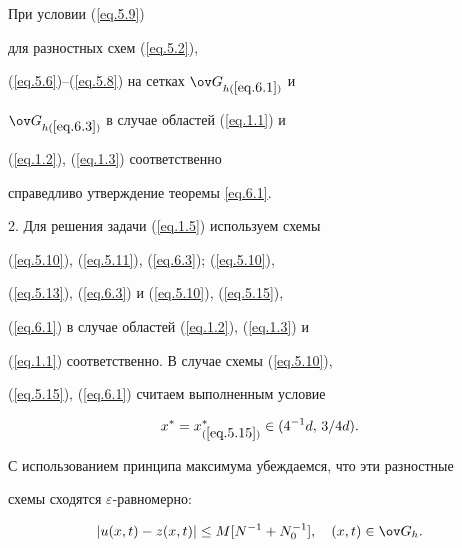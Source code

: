 \begin{notenonum}


При условии (\ref{eq.5.9})


для разностных схем (\ref{eq.5.2}),


(\ref{eq.5.6})--(\ref{eq.5.8}) на сетках $\ov G_{h(\ref{eq.6.1})}$ и


$\ov G_{h(\ref{eq.6.3})}$ в случае областей (\ref{eq.1.1}) и


(\ref{eq.1.2}), (\ref{eq.1.3}) соответственно


справедливо утверждение теоремы \ref{eq.6.1}.


\end{notenonum}





2. Для решения задачи (\ref{eq.1.5}) используем схемы


(\ref{eq.5.10}), (\ref{eq.5.11}), (\ref{eq.6.3}); (\ref{eq.5.10}),


(\ref{eq.5.13}), (\ref{eq.6.3}) и (\ref{eq.5.10}), (\ref{eq.5.15}),


(\ref{eq.6.1}) в случае областей (\ref{eq.1.2}), (\ref{eq.1.3}) и


(\ref{eq.1.1}) соответственно. В случае схемы (\ref{eq.5.10}),


(\ref{eq.5.15}), (\ref{eq.6.1}) считаем выполненным условие


\begin{equation}


\label{eq.6.4}


x^*=x^*_{(\ref{eq.5.15})}\in (4^{-1} d, \, 3/4 d).


\end{equation}


С использованием принципа максимума убеждаемся, что эти разностные


схемы сходятся $\varepsilon$-равномерно:


\begin{equation}


\label{eq.6.5}


|u(x, t)-z(x, t)|\le M [N^{-1}+N_0^{-1}], \quad (x, t)\in \ov G_h.


\end{equation}





